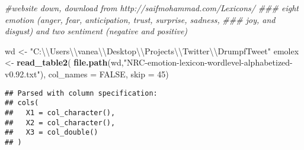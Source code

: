 \documentclass[]{article}
\newenvironment{Shaded}{\begin{snugshade}}{\end{snugshade}}
\newcommand{\CharTok}[1]{\textcolor[rgb]{0.31,0.60,0.02}{#1}}
\newcommand{\CommentTok}[1]{\textcolor[rgb]{0.56,0.35,0.01}{\textit{#1}}}
\newcommand{\DataTypeTok}[1]{\textcolor[rgb]{0.13,0.29,0.53}{#1}}
\newcommand{\DecValTok}[1]{\textcolor[rgb]{0.00,0.00,0.81}{#1}}
\newcommand{\KeywordTok}[1]{\textcolor[rgb]{0.13,0.29,0.53}{\textbf{#1}}}
\newcommand{\NormalTok}[1]{#1}
\newcommand{\OtherTok}[1]{\textcolor[rgb]{0.56,0.35,0.01}{#1}}
\newcommand{\StringTok}[1]{\textcolor[rgb]{0.31,0.60,0.02}{#1}}
\begin{document}
\begin{Shaded}
\begin{Highlighting}[]
\CommentTok{#website down, download from http://saifmohammad.com/Lexicons/}
\CommentTok{### eight emotion (anger, fear, anticipation, trust, surprise, sadness,}
\CommentTok{### joy, and disgust) and two sentiment (negative and positive)}

\NormalTok{wd <-}\StringTok{ "C:}\CharTok{\textbackslash{}\textbackslash{}}\StringTok{Users}\CharTok{\textbackslash{}\textbackslash{}}\StringTok{vanea}\CharTok{\textbackslash{}\textbackslash{}}\StringTok{Desktop}\CharTok{\textbackslash{}\textbackslash{}}\StringTok{Projects}\CharTok{\textbackslash{}\textbackslash{}}\StringTok{Twitter}\CharTok{\textbackslash{}\textbackslash{}}\StringTok{DrumpfTweet"}
\NormalTok{emolex <-}\StringTok{ }\KeywordTok{read_table2}\NormalTok{(}
  \KeywordTok{file.path}\NormalTok{(wd,}\StringTok{"NRC-emotion-lexicon-wordlevel-alphabetized-v0.92.txt"}\NormalTok{),}
  \DataTypeTok{col_names =} \OtherTok{FALSE}\NormalTok{,}
  \DataTypeTok{skip =} \DecValTok{45}\NormalTok{)}
\end{Highlighting}
\end{Shaded}

\begin{verbatim}
## Parsed with column specification:
## cols(
##   X1 = col_character(),
##   X2 = col_character(),
##   X3 = col_double()
## )
\end{verbatim}
\end{document}
